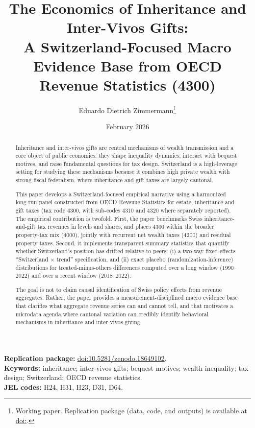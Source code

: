 \documentclass[11pt,a4paper]{article}
\title{\vspace{-1.2em}\textbf{The Economics of Inheritance and Inter-Vivos Gifts: \\
A Switzerland-Focused Macro Evidence Base from OECD Revenue Statistics (4300)}}
\author{Eduardo Dietrich Zimmermann\thanks{Working paper. Replication package (data, code, and outputs) is available at \href{\ReplicationURL}{doi:\ReplicationDOI}.}}
\date{February 2026}
\newcommand{\ReplicationDOI}{10.5281/zenodo.18649102}
\newcommand{\ReplicationURL}{https://doi.org/\ReplicationDOI}
\begin{document}
\maketitle

\begin{abstract}
Inheritance and inter-vivos gifts are central mechanisms of wealth transmission and a core object of public economics: they shape inequality dynamics, interact with bequest motives, and raise fundamental questions for tax design. Switzerland is a high-leverage setting for studying these mechanisms because it combines high private wealth with strong fiscal federalism, where inheritance and gift taxes are largely cantonal.

This paper develops a Switzerland-focused empirical narrative using a harmonized long-run panel constructed from OECD Revenue Statistics for estate, inheritance and gift taxes (tax code 4300, with sub-codes 4310 and 4320 where separately reported). The empirical contribution is twofold. First, the paper benchmarks Swiss inheritance-and-gift tax revenues in levels and shares, and places 4300 within the broader property-tax mix (4000), jointly with recurrent net wealth taxes (4200) and residual property taxes. Second, it implements transparent summary statistics that quantify whether Switzerland's position has drifted relative to peers: (i) a two-way fixed-effects ``Switzerland $\times$ trend'' specification, and (ii) exact placebo (randomization-inference) distributions for treated-minus-others differences computed over a long window (1990--2022) and over a recent window (2018--2022).

The goal is not to claim causal identification of Swiss policy effects from revenue aggregates. Rather, the paper provides a measurement-disciplined macro evidence base that clarifies what aggregate revenue series can and cannot tell, and that motivates a microdata agenda where cantonal variation can credibly identify behavioral mechanisms in inheritance and inter-vivos giving.
\end{abstract}

\vspace{0.5em}
\noindent\textbf{Replication package:} \href{\ReplicationURL}{doi:\ReplicationDOI}.\\
\textbf{Keywords:} inheritance; inter-vivos gifts; bequest motives; wealth inequality; tax design; Switzerland; OECD revenue statistics.\\
\textbf{JEL codes:} H24, H31, H23, D31, D64.

\newpage
\tableofcontents
\newpage
\end{document}
